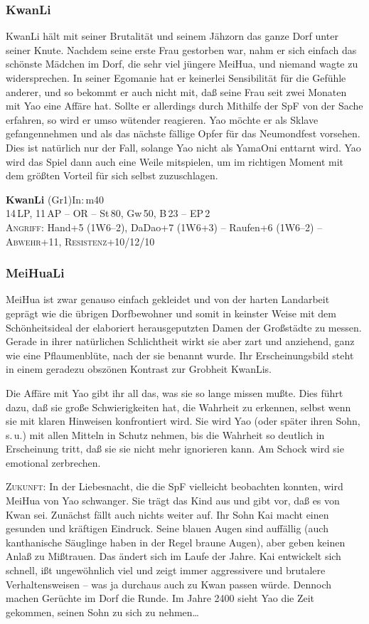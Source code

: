 \documentclass[
a4paper,
twoside,
DIV=calc,
BCOR=4mm,
fontsize=9pt,
twocolumn=on,
titlepage=on,
parskip=half
]{scrartcl}
\begin{document}
\subsubsection{KwanLi}

KwanLi hält mit seiner Brutalität und seinem Jähzorn das ganze Dorf
unter seiner Knute. Nachdem seine erste Frau gestorben war, nahm er
sich einfach das schönste Mädchen im Dorf, die sehr viel jüngere
MeiHua, und niemand wagte zu widersprechen. In seiner Egomanie hat er
keinerlei Sensibilität für die Gefühle anderer, und so bekommt er auch
nicht mit, daß seine Frau seit zwei Monaten mit Yao eine Affäre
hat. Sollte er allerdings durch Mithilfe der SpF von der Sache
erfahren, so wird er umso wütender reagieren. Yao möchte er als Sklave
gefangennehmen und als das nächste fällige Opfer für das Neumondfest
vorsehen. Dies ist natürlich nur der Fall, solange Yao nicht als
YamaOni enttarnt wird. Yao wird das Spiel dann auch eine Weile
mitspielen, um im richtigen Moment mit dem größten Vorteil für sich
selbst zuzuschlagen. 

\textbf{KwanLi} (Gr1)\hfill In:\,m40\\
14\,LP, 11\,AP -- OR -- St\,80, Gw\,50, B\,23 -- EP\,2\\
\textsc{Angriff:} Hand+5 (1W6--2), DaDao+7 (1W6+3) -- Raufen+6 (1W6--2) -- \textsc{Abwehr}+11,
\textsc{Resistenz}+10/12/10

\subsubsection{MeiHuaLi}

MeiHua ist zwar genauso einfach gekleidet und von der harten
Landarbeit geprägt wie die übrigen Dorfbewohner und somit in keinster
Weise mit dem Schönheitsideal der elaboriert herausgeputzten Damen der
Großstädte zu messen. Gerade in ihrer natürlichen Schlichtheit wirkt
sie aber zart und anziehend, ganz wie eine Pflaumenblüte, nach der sie
benannt wurde. Ihr Erscheinungsbild steht in einem geradezu obszönen
Kontrast zur Grobheit KwanLis.

Die Affäre mit Yao gibt ihr all das, was sie so lange missen
mußte. Dies führt dazu, daß sie große Schwierigkeiten hat, die
Wahrheit zu erkennen, selbst wenn sie mit klaren Hinweisen
konfrontiert wird. Sie wird Yao (oder später ihren Sohn, s.\,u.) mit
allen Mitteln in Schutz nehmen, bis die Wahrheit so deutlich in
Erscheinung tritt, daß sie sie nicht mehr ignorieren kann. Am Schock
wird sie emotional zerbrechen.

\textsc{Zukunft:} In der Liebesnacht, die die SpF vielleicht
beobachten konnten, wird MeiHua von Yao schwanger. Sie trägt das Kind
aus und gibt vor, daß es von Kwan sei. Zunächst fällt auch nichts
weiter auf. Ihr Sohn Kai macht einen gesunden und kräftigen
Eindruck. Seine blauen Augen sind auffällig (auch kanthanische
Säuglinge haben in der Regel braune Augen), aber geben keinen Anlaß zu
Mißtrauen. Das ändert sich im Laufe der Jahre. Kai entwickelt sich
schnell, ißt ungewöhnlich viel und zeigt immer aggressivere und
brutalere Verhaltensweisen -- was ja durchaus auch zu Kwan passen
würde. Dennoch machen Gerüchte im Dorf die Runde. Im Jahre 2400 sieht
Yao die Zeit gekommen, seinen Sohn zu sich zu nehmen\dots
\end{document}
